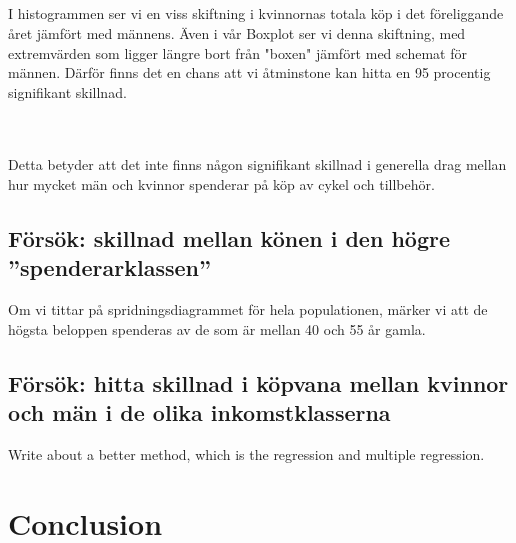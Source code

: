 \documentclass[]{article}
\begin{document}
\\\\\\\\\\\\\\\\\\\\\\\\\\\\

I histogrammen ser vi en viss skiftning i kvinnornas totala köp i det föreliggande året jämfört med männens. Även i vår Boxplot ser vi denna skiftning, med extremvärden som ligger längre bort från "boxen" jämfört med schemat för männen. Därför finns det en chans att vi åtminstone kan hitta en 95 procentig signifikant skillnad.

\\\\

Detta betyder att det inte finns någon signifikant skillnad i generella drag mellan hur mycket män och kvinnor spenderar på köp av cykel och tillbehör.

\subsection{Försök: skillnad mellan könen i den högre ''spenderarklassen''}

Om vi tittar på spridningsdiagrammet för hela populationen, märker vi att de högsta beloppen spenderas av de som är mellan 40 och 55 år gamla.


\newpage


\subsection{Försök: hitta skillnad i köpvana mellan kvinnor och män i de olika inkomstklasserna}



Write about a better method, which is the regression and multiple regression.



\section{Conclusion}
\end{document}
